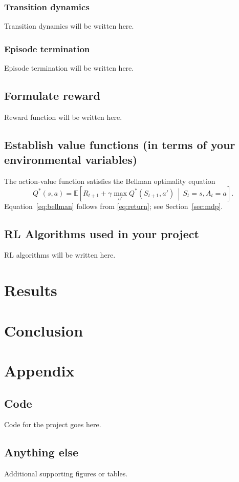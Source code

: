 \documentclass{rlreport}
\begin{document}
\subsubsection{Transition dynamics}
Transition dynamics will be written here.

\subsubsection{Episode termination}
Episode termination will be written here.

\subsection{Formulate reward}
Reward function will be written here.

\subsection{Establish value functions (in terms of your environmental variables)}
The action-value function satisfies the Bellman optimality equation
\begin{equation}
  Q^{*}(s,a) = \mathbb{E}\!\left[ R_{t+1} + \gamma \max_{a'} Q^{*}(S_{t+1}, a') \,\middle|\, S_t = s, A_t = a \right].
  \label{eq:bellman}
\end{equation}
Equation~\eqref{eq:bellman} follows from \eqref{eq:return}; see Section~\ref{sec:mdp}.

\subsection{RL Algorithms used in your project}
RL algorithms will be written here.
 


\section{Results}
\label{sec:results}


\section{Conclusion}





\section*{Appendix}
\subsection{Code}
Code for the project goes here.

\subsection{Anything else}
Additional supporting figures or tables.
\end{document}
